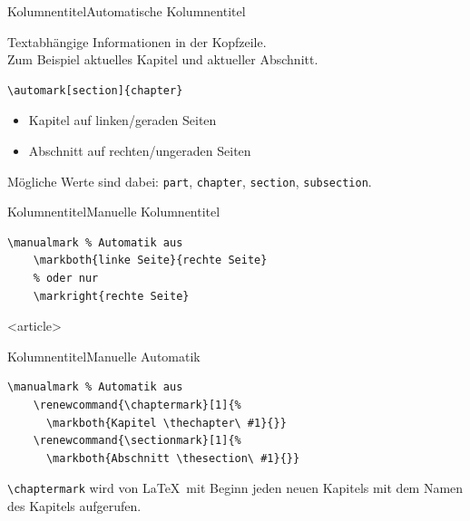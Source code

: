 \begin{Frame}[fragile,t]{Kolumnentitel}{Automatische Kolumnentitel}
  \xxx\xxx

  \begin{Definition}
    Textabhängige Informationen in der Kopfzeile.\\
    Zum Beispiel aktuelles Kapitel und aktueller Abschnitt.
  \end{Definition}

  \xxx

  \begin{lstlisting}[gobble=4]
    \automark[section]{chapter}
  \end{lstlisting}
  \begin{itemize}
    \item Kapitel auf linken/geraden Seiten
    \item Abschnitt auf rechten/ungeraden Seiten
  \end{itemize}

  Mögliche Werte sind dabei: \lstinline-part-, \lstinline-chapter-,
  \lstinline-section-, \lstinline-subsection-.
\end{Frame}

\begin{Frame}[fragile,t]{Kolumnentitel}{Manuelle Kolumnentitel}
  \xxx\xxx


  \xxx

  \begin{lstlisting}[gobble=4]
    \manualmark % Automatik aus
    \markboth{linke Seite}{rechte Seite}
    % oder nur
    \markright{rechte Seite}
  \end{lstlisting}
\end{Frame}

\mode
<article>

\begin{Frame}[fragile]{Kolumnentitel}{Manuelle Automatik}
  \begin{lstlisting}[gobble=4]
    \manualmark % Automatik aus
    \renewcommand{\chaptermark}[1]{%
      \markboth{Kapitel \thechapter\ #1}{}}
    \renewcommand{\sectionmark}[1]{%
      \markboth{Abschnitt \thesection\ #1}{}}
  \end{lstlisting}
  \lstinline-\chaptermark- wird von \LaTeX\ mit Beginn
  jeden neuen Kapitels mit dem Namen des Kapitels aufgerufen.
\end{Frame}

